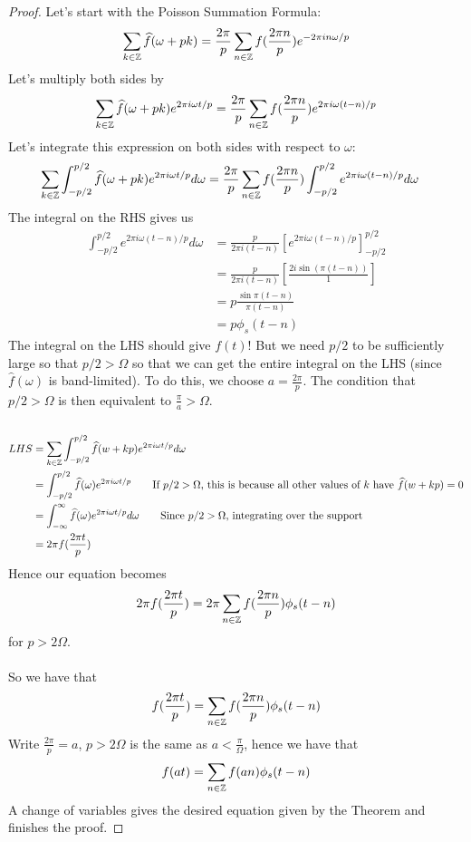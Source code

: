 \documentclass{article}
\begin{document}
\begin{proof}
    Let's start with the Poisson Summation Formula:
    \[\sum_{k \in \mathbb{Z}} \widehat{f}(\omega + pk) = \frac{2\pi}{p} \sum_{n \in \mathbb{Z}} f(\frac{2\pi n}{p}) e^{-2\pi i n \omega/p}\]
    Let's multiply both sides by
    \[\sum_{k \in \mathbb{Z}} \widehat{f}(\omega + pk) e^{2\pi i \omega t/p} = \frac{2\pi}{p} \sum_{n \in \mathbb{Z}} f(\frac{2\pi n}{p}) e^{2\pi i\omega (t - n)/p}\]
    Let's integrate this expression on both sides with respect to $\omega$:
    \begin{align*}
        \sum_{k \in \mathbb{Z}} \int_{-p/2}^{p/2} \widehat{f}(\omega + pk) e^{2\pi i \omega t/p} d\omega &= \frac{2\pi}{p} \sum_{n \in \mathbb{Z}} f(\frac{2\pi n}{p}) \int_{-p/2}^{p/2} e^{2\pi i\omega (t - n)/p} d\omega
    \end{align*}
    The integral on the RHS gives us
    \begin{align*}
        \int_{-p/2}^{p/2} e^{2\pi i\omega (t - n)/p} d\omega &= \frac{p}{2\pi i (t-n)}[e^{2\pi i \omega (t - n)/p}]_{-p/2}^{p/2}\\
        &= \frac{p}{2\pi i (t-n)} [\frac{2i \sin(\pi(t - n))}{1}]\\
        &= p \frac{\sin \pi(t - n)}{\pi(t - n)}\\
        &= p \phi_s(t - n)
    \end{align*}
    The integral on the LHS should give $f(t)$! But we need $p/2$ to be sufficiently large so that $p/2 > \Omega$ so that we can get the entire integral on the LHS (since $\widehat{f}(\omega)$ is band-limited). To do this, we choose $a = \frac{2\pi}{p}$. The condition that $p/2 > \Omega$ is then equivalent to $\frac{\pi}{a} > \Omega$.\\\\
    \begin{align*}
        LHS &= \sum_{k \in \Zbb} \int_{-p/2}^{p/2} \widehat{f}(w + kp) e^{2\pi i \omega t/p} d\omega\\
        &= \int_{-p/2}^{p/2} \widehat{f}(\omega) e^{2\pi i \omega t/p} \tag*{If $p/2 > \Omega$, this is because all other values of $k$ have $\widehat{f}(w + kp) = 0$}\\
        &= \int_{-\infty}^\infty \widehat{f}(\omega) e^{2\pi i \omega t/p} d\omega \tag*{Since $p/2 > \Omega$, integrating over the support}\\
        &= 2\pi f(\frac{2\pi t}{p})
    \end{align*}
    Hence our equation becomes
    \[2\pi f(\frac{2\pi t}{p}) = 2\pi \sum_{n \in \mathbb{Z}} f(\frac{2\pi n}{p}) \phi_s(t - n)\]
    for $p > 2 \Omega$.\\\\
    So we have that
    \[f(\frac{2\pi t}{p}) = \sum_{n \in \mathbb{Z}} f(\frac{2\pi n}{p}) \phi_s(t - n)\]
    Write $\frac{2\pi}{p} = a$, $p > 2 \Omega$ is the same as $a < \frac{\pi}{\Omega}$, hence we have that
    \[f(at) = \sum_{n \in \mathbb{Z}} f(an) \phi_s(t - n)\]
    A change of variables gives the desired equation given by the Theorem and finishes the proof.
\end{proof}
\end{document}
